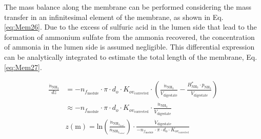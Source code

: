 \begin{refsection}[referencesApD]
The mass balance along the membrane can be performed considering the mass transfer in an infinitesimal element of the membrane, as shown in Eq. \ref{eq:Mem26}. Due to the excess of sulfuric acid in the lumen side that lead to the formation of ammonium sulfate from the ammonia recovered, the concentration of ammonia in the lumen side is assumed negligible. This differential expression can be analytically integrated to estimate the total length of the membrane, Eq. \ref{eq:Mem27}.

\begin{align}
\frac{\dot{n}_{\text{NH}_3}}{dz} &= -n_{f_{\text{module}}} \cdot \pi \cdot d_o \cdot K_{{ov}_\text{corrected}} \cdot \left( \frac{\dot{n}_{\text{NH}_3}}{\dot{V}_{\text{digestate}}} - \frac{ H_{\text{NH}_3}^* \cdot p_{\text{NH}_3}}{\dot{V}_{\text{digestate}}}\right) \nonumber
\\ 
& \approx -n_{f_{\text{module}}} \cdot \pi \cdot d_o \cdot K_{{ov}_\text{corrected}} \cdot \frac{\dot{n}_{\text{NH}_3}}{\dot{V}_{\text{digestate}}} \label{eq:Mem26}
\\
& z \left(\text{m}\right) = \text{ln}\left(\frac{\dot{n}_{\text{NH}_{3_{final}}}}{\dot{n}_{\text{NH}_{3_{initial}}}}\right) \cdot \frac{\dot{V}_{\text{digestate}}}{-n_{f_{\text{module}}} \cdot \pi \cdot d_o \cdot K_{{ov}_\text{corrected}}} \label{eq:Mem27}
\end{align}


\end{refsection}
